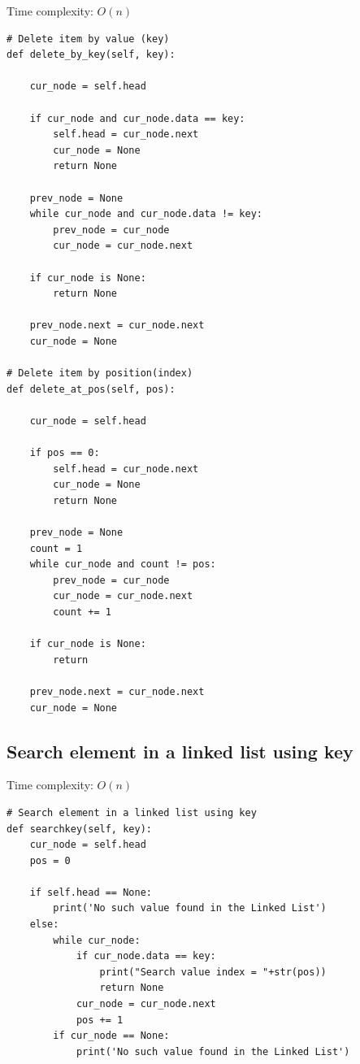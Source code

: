 \documentclass[a4paper,11pt]{book}
\begin{document}
\noindent Time complexity: $O(n)$

\begin{lstlisting}
# Delete item by value (key)
def delete_by_key(self, key):

    cur_node = self.head

    if cur_node and cur_node.data == key:
        self.head = cur_node.next
        cur_node = None
        return None

    prev_node = None 
    while cur_node and cur_node.data != key:
        prev_node = cur_node
        cur_node = cur_node.next

    if cur_node is None:
        return None

    prev_node.next = cur_node.next
    cur_node = None

# Delete item by position(index)
def delete_at_pos(self, pos):

    cur_node = self.head

    if pos == 0:
        self.head = cur_node.next
        cur_node = None
        return None

    prev_node = None
    count = 1
    while cur_node and count != pos:
        prev_node = cur_node 
        cur_node = cur_node.next
        count += 1

    if cur_node is None:
        return 

    prev_node.next = cur_node.next
    cur_node = None
\end{lstlisting}

\subsection{Search element in a linked list using key}
\vspace{5mm}

\noindent Time complexity: $O(n)$

\begin{lstlisting}
# Search element in a linked list using key
def searchkey(self, key):
    cur_node = self.head
    pos = 0
    
    if self.head == None:
        print('No such value found in the Linked List')
    else:
        while cur_node:
            if cur_node.data == key:
                print("Search value index = "+str(pos))
                return None
            cur_node = cur_node.next
            pos += 1
        if cur_node == None:
            print('No such value found in the Linked List')
\end{lstlisting}
\end{document}
